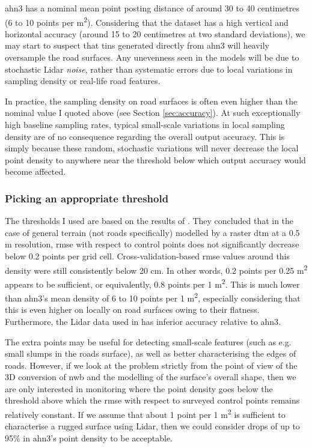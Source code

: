 \ac{ahn3} has a nominal mean point posting distance of around 30 to 40 centimetres (6 to 10 points per m\textsuperscript{2}). Considering that the dataset has a high vertical and horizontal accuracy (around 15 to 20 centimetres at two standard deviations), we may start to suspect that \ac{tin}s generated directly from \ac{ahn3} will heavily oversample the road surfaces. Any unevenness seen in the models will be due to stochastic Lidar \textit{noise}, rather than systematic errors due to local variations in sampling density or real-life road features.

In practice, the sampling density on road surfaces is often even higher than the nominal value I quoted above (see Section \ref{sec:accuracy}). At such exceptionally high baseline sampling rates, typical small-scale variations in local sampling density are of no consequence regarding the overall output accuracy. This is simply because these random, stochastic variations will never decrease the local point density to anywhere near the threshold below which output accuracy would become affected.

\subsubsection{Picking an appropriate threshold}

The thresholds I used are based on the results of \cite{guo_etal_2010}. They concluded that in the case of general terrain (not roads specifically) modelled by a raster \ac{dtm} at a 0.5 m resolution, \ac{rmse} with respect to control points does not significantly decrease below 0.2 points per grid cell. Cross-validation-based \ac{rmse} values around this density were still consistently below 20 cm. In other words, 0.2 points per 0.25 m\textsuperscript{2} appears to be sufficient, or equivalently, 0.8 points per 1 m\textsuperscript{2}. This is much lower than \ac{ahn3}'s mean density of 6 to 10 points per 1 m\textsuperscript{2}, especially considering that this is even higher on locally on road surfaces owing to their flatness. Furthermore, the Lidar data used in \cite{guo_etal_2010} has inferior accuracy relative to \ac{ahn3}.

The extra points may be useful for detecting small-scale features (such as e.g. small slumps in the roads surface), as well as better characterising the edges of roads. However, if we look at the problem strictly from the point of view of the 3D conversion of \ac{nwb} and the modelling of the surface's overall shape, then we are only interested in monitoring where the point density goes below the threshold above which the \ac{rmse} with respect to surveyed control points remains relatively constant. If we assume that about 1 point per 1 m\textsuperscript{2} is sufficient to characterise a rugged surface using Lidar, then we could consider drops of up to 95\% in \ac{ahn3}'s point density to be acceptable.

